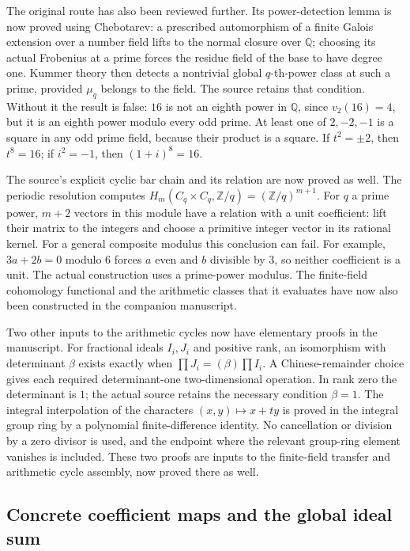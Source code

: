 \documentclass[11pt,a4paper]{article}
\theoremstyle{remark}
\newcommand{\Z}{\mathbb Z}
\newcommand{\Q}{\mathbb Q}
\begin{document}
The original route has also been reviewed further. Its power-detection
lemma is now proved using Chebotarev: a prescribed automorphism of a
finite Galois extension over a number field lifts to the normal closure
over $\Q$; choosing its actual Frobenius at a prime forces the residue
field of the base to have degree one. Kummer theory then detects a
nontrivial global $q$-th-power class at such a prime, provided
$\mu_q$ belongs to the field. The source retains that condition.
Without it the result is false: $16$ is not an eighth power in
$\Q$, since $v_2(16)=4$, but it is an eighth power modulo every
odd prime. At least one of $2,-2,-1$ is a square in any odd prime
field, because their product is a square. If $t^2=\pm2$, then
$t^8=16$; if $i^2=-1$, then $(1+i)^8=16$.

The source's explicit cyclic bar chain and its relation are now
proved as well. The periodic resolution computes
$H_m(C_q\times C_q,\Z/q)= (\Z/q)^{m+1}$.
For $q$ a prime power, $m+2$ vectors in this module have a relation
with a unit coefficient: lift their matrix to the integers and
choose a primitive integer vector in its rational kernel.
For a general composite modulus this conclusion can fail.
For example, $3a+2b=0$ modulo $6$ forces $a$ even and $b$ divisible
by $3$, so neither coefficient is a unit. The actual construction
uses a prime-power modulus. The finite-field cohomology functional
and the arithmetic classes that it evaluates have now also been
constructed in the companion manuscript.

Two other inputs to the arithmetic cycles now have elementary
proofs in the manuscript. For fractional ideals $I_i,J_i$ and
positive rank, an isomorphism with determinant $\beta$ exists
exactly when $\prod J_i=(\beta)\prod I_i$. A Chinese-remainder
choice gives each required determinant-one two-dimensional
operation. In rank zero the determinant is $1$; the actual source
retains the necessary condition $\beta=1$. The integral
interpolation of the characters $(x,y)\mapsto x+ty$ is proved
in the integral group ring by a polynomial finite-difference
identity. No cancellation or division by a zero divisor is used,
and the endpoint where the relevant group-ring element vanishes
is included. These two proofs are inputs to the finite-field
transfer and arithmetic cycle assembly, now proved there as well.

\subsection{Concrete coefficient maps and the global ideal sum}
\end{document}
